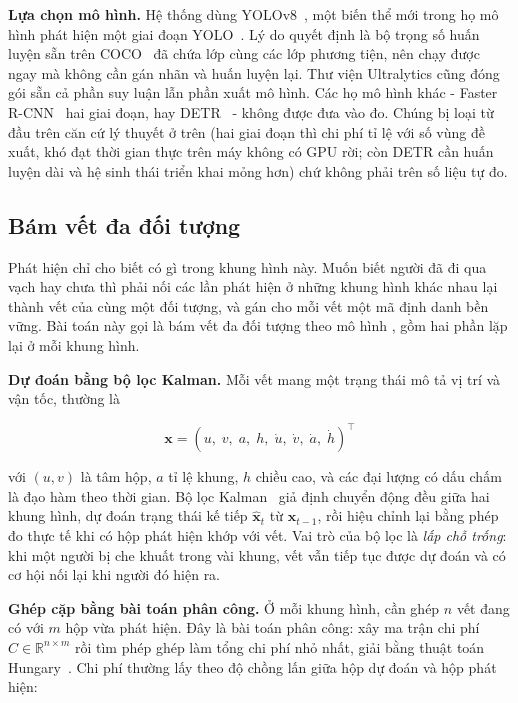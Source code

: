 \textbf{Lựa chọn mô hình.} Hệ thống dùng YOLOv8~\cite{jocher2023ultralytics}, một biến thể
mới trong họ mô hình phát hiện một giai đoạn YOLO~\cite{redmon2016yolo}. Lý do quyết định là bộ trọng số huấn
luyện sẵn trên COCO~\cite{lin2014coco} đã chứa lớp  cùng các lớp phương tiện, nên chạy được
ngay mà không cần gán nhãn và huấn luyện lại. Thư viện Ultralytics cũng đóng gói sẵn cả phần suy luận lẫn phần xuất
mô hình. Các họ mô hình khác - Faster R-CNN~\cite{ren2015faster} hai giai
đoạn, hay DETR~\cite{carion2020detr} - không được đưa vào đo. Chúng bị loại từ đầu trên căn cứ lý
thuyết ở trên (hai giai đoạn thì chi phí tỉ lệ với số vùng đề xuất, khó đạt thời gian
thực trên máy không có GPU rời; còn DETR cần huấn luyện dài và hệ sinh thái triển khai
mỏng hơn) chứ không phải trên số liệu tự đo. 



\subsection{Bám vết đa đối tượng}
\label{sub:bamvet-lythuyet}

Phát hiện chỉ cho biết có gì trong khung hình này. Muốn biết  người đã đi qua vạch hay chưa thì phải nối các lần phát hiện ở những khung hình khác nhau lại
thành vết của cùng một đối tượng, và gán cho mỗi vết một mã định danh bền vững.
Bài toán này gọi là bám vết đa đối tượng theo mô hình , gồm
hai phần lặp lại ở mỗi khung hình.

\textbf{Dự đoán bằng bộ lọc Kalman.} Mỗi vết mang một trạng thái mô tả vị trí và vận
tốc, thường là

\begin{equation}
  \mathbf{x} = (u,\; v,\; a,\; h,\; \dot{u},\; \dot{v},\; \dot{a},\; \dot{h})^\top
  \label{eq:kalman-state}
\end{equation}

với $(u,v)$ là tâm hộp, $a$ tỉ lệ khung, $h$ chiều cao, và các đại lượng có dấu chấm là
đạo hàm theo thời gian. Bộ lọc Kalman~\cite{kalman1960} giả định chuyển động đều giữa hai khung hình, dự
đoán trạng thái kế tiếp $\hat{\mathbf{x}}_{t}$ từ $\mathbf{x}_{t-1}$, rồi hiệu chỉnh lại
bằng phép đo thực tế khi có hộp phát hiện khớp với vết. Vai trò của bộ lọc là \emph{lấp
chỗ trống}: khi một người bị che khuất trong vài khung, vết vẫn tiếp tục được dự đoán và
có cơ hội nối lại khi người đó hiện ra.

\textbf{Ghép cặp bằng bài toán phân công.} Ở mỗi khung hình, cần ghép $n$ vết đang có
với $m$ hộp vừa phát hiện. Đây là bài toán phân công: xây ma trận chi phí
$C \in \mathbb{R}^{n \times m}$ rồi tìm phép ghép làm tổng chi phí nhỏ nhất, giải bằng
thuật toán Hungary~\cite{kuhn1955hungarian}. Chi phí thường lấy theo độ chồng lấn giữa hộp dự đoán và hộp phát
hiện:

